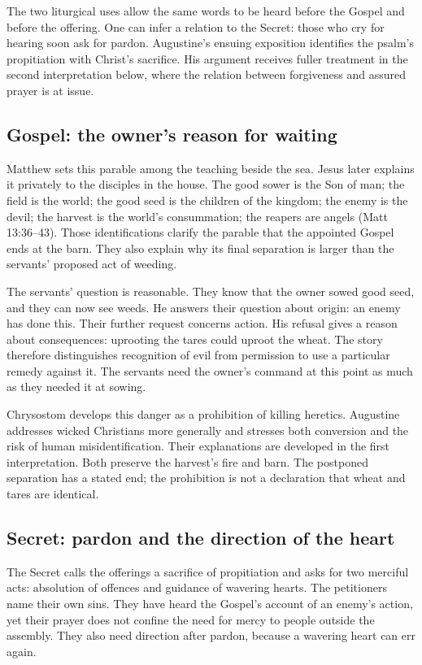 The two liturgical uses allow the same words to be heard before the
Gospel and before the offering. One can infer a relation to the Secret:
those who cry for hearing soon ask for pardon. Augustine's ensuing
exposition identifies the psalm's propitiation with Christ's sacrifice.
His argument receives fuller treatment in the second interpretation
below, where the relation between forgiveness and assured prayer is at
issue.

\subsection{Gospel: the owner's reason for waiting}
Matthew sets this parable among the teaching beside the sea. Jesus later
explains it privately to the disciples in the house. The good sower is
the Son of man; the field is the world; the good seed is the children of
the kingdom; the enemy is the devil; the harvest is the world's
consummation; the reapers are angels (Matt 13:36--43). Those identifications
clarify the parable that the appointed Gospel ends at the barn. They also
explain why its final separation is larger than the servants' proposed
act of weeding.

The servants' question is reasonable. They know that the owner sowed good
seed, and they can now see weeds. He answers their question about origin:
an enemy has done this. Their further request concerns action. His
refusal gives a reason about consequences: uprooting the tares could
uproot the wheat. The story therefore distinguishes recognition of evil
from permission to use a particular remedy against it. The servants need
the owner's command at this point as much as they needed it at sowing.

Chrysostom develops this danger as a prohibition of killing heretics.
Augustine addresses wicked Christians more generally and stresses both
conversion and the risk of human misidentification. Their explanations
are developed in the first interpretation. Both preserve the harvest's
fire and barn. The postponed separation has a stated end; the prohibition
is not a declaration that wheat and tares are identical.

\subsection{Secret: pardon and the direction of the heart}
The Secret calls the offerings a sacrifice of propitiation and asks for
two merciful acts: absolution of offences and guidance of wavering hearts.
The petitioners name their own sins. They have heard the Gospel's account
of an enemy's action, yet their prayer does not confine the need for
mercy to people outside the assembly. They also need direction after
pardon, because a wavering heart can err again.

